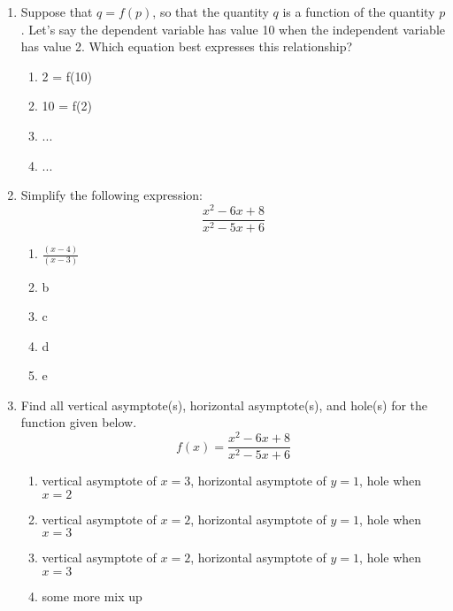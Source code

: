 \documentclass{article}
\begin{document}
\begin{enumerate}
    \item Suppose that $q = f(p)$, so that the quantity $q$ is a function of the quantity $p$. Let's say the dependent variable has value 10 when the independent variable has value 2. Which equation best expresses this relationship?
    \begin{enumerate}
        \item 2 = f(10)
        \item 10 = f(2) %
        \item ...
        \item ...
    \end{enumerate}
    
    \item Simplify the following expression:
        \[  \frac{x^2-6x+8}{x^2-5x+6}
        \]
        \begin{enumerate}
            \item $\displaystyle \frac{(x-4)}{(x-3)}$ %
            \item b
            \item c
            \item d
            \item e
        \end{enumerate}
        
    \item Find all vertical asymptote(s), horizontal asymptote(s), and hole(s) for the function given below.
        \[ f(x) = \frac{x^2-6x+8}{x^2-5x+6}
        \]
        
        \begin{enumerate}
            \item vertical asymptote of $x=3$, horizontal asymptote of $y=1$, hole when $x=2$ %
            \item vertical asymptote of $x=2$, horizontal asymptote of $y=1$, hole when $x=3$
            \item vertical asymptote of $x=2$, horizontal asymptote of $y=1$, hole when $x=3$
            \item some more mix up
        \end{enumerate}
    

\end{enumerate}
\end{document}
